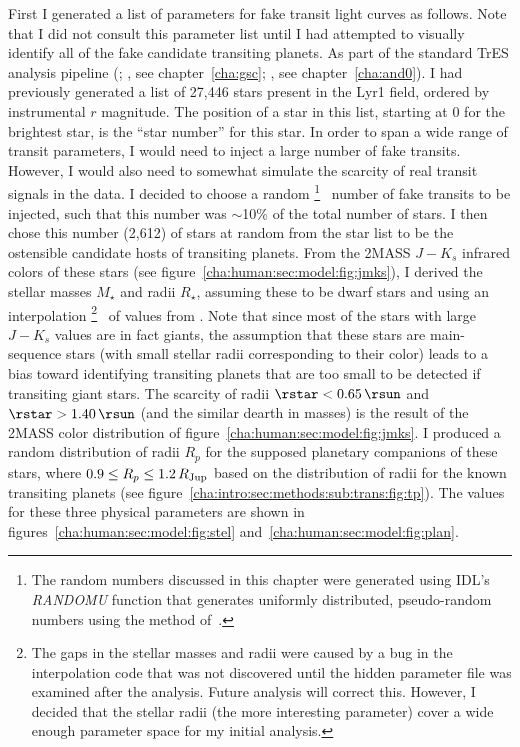 First I generated a list of parameters for fake transit light curves as follows.
Note that I did not consult this parameter list until I had attempted to visually identify all of the fake candidate transiting planets.
As part of the standard TrES analysis pipeline (\citealp[see, e.g.,][]{Dunham_Mandushev_Taylor:pasp:2004a}; \citealp{ODonovan_Charbonneau_Torres:apj:2006a}, see chapter~\ref{cha:gsc}; \citealp{ODonovan_Charbonneau_Alonso:apj:2007a}, see chapter~\ref{cha:and0}).
I had previously generated a list of 27,446 stars present in the Lyr1 field, ordered by instrumental $r$ magnitude.
The position of a star in this list, starting at 0 for the brightest star, is the ``star number'' for this star.
In order to span a wide range of transit parameters, I would need to inject a large number of fake transits.
However, I would also need to somewhat simulate the scarcity of real transit signals in the data.
I decided to choose a random%
\footnote{%
The random numbers discussed in this chapter were generated using IDL's \textit{RANDOMU} function that generates uniformly distributed, pseudo-random numbers using the method of~\citet{Park_Miller:ACM:1988a}.%
}%
\ number of fake transits to be injected, such that this number was $\sim$10\% of the total number of stars.
I then chose this number (2,612) of stars at random from the star list to be the ostensible candidate hosts of transiting planets.
From the 2MASS \citep{Cutri_Skrutskie_van-Dyk:2003a} $J-K_{s}$ infrared colors of these stars (see figure~\ref{cha:human:sec:model:fig:jmks}), I derived the stellar masses $M_{\star}$ and radii $R_{\star}$, assuming these to be dwarf stars and using an interpolation%
\footnote{%
The gaps in the stellar masses and radii were caused by a bug in the interpolation code that was not discovered until the hidden parameter file was examined after the analysis.
Future analysis will correct this.
However, I decided that the stellar radii (the more interesting parameter) cover a wide enough parameter space for my initial analysis.%
}%
\ of values from \citet{Cox::2000a}.
Note that since most of the stars with large $J-K_{s}$ values are in fact giants, the assumption that these stars are main-sequence stars (with small stellar radii corresponding to their color) leads to a bias toward identifying transiting planets that are too small to be detected if transiting giant stars.
The scarcity of radii $\rstar<0.65\,\rsun$ and $\rstar>1.40\,\rsun$ (and the similar dearth in masses) is the result of the 2MASS color distribution of figure~\ref{cha:human:sec:model:fig:jmks}.
I produced a random distribution of radii $R_{p}$ for the supposed planetary companions of these stars, where $0.9\leq R_{p} \leq 1.2\,R_{\rm Jup}$ based on the distribution of radii for the known transiting planets (see figure~\ref{cha:intro:sec:methods:sub:trans:fig:tp}).
The values for these three physical parameters are shown in figures~\ref{cha:human:sec:model:fig:stel} and~\ref{cha:human:sec:model:fig:plan}.

